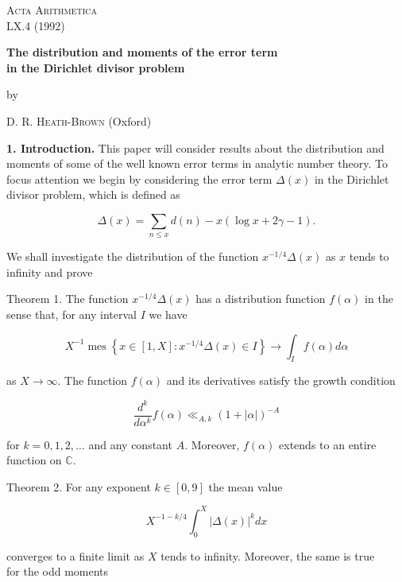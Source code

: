 \documentclass[10pt]{article}
\newcommand{\articleSection}[2]{%
  \par\medskip\noindent\textbf{#1. #2.}\enspace
}
\begin{document}
\vspace*{-2em}
\begin{flushleft}
\textsc{Acta Arithmetica}\\
LX.4 (1992)
\end{flushleft}

\vspace{4em}
\begin{center}
{\LARGE\bfseries The distribution and moments of the error term\\
in the Dirichlet divisor problem\par}
\vspace{1.5em}
{\normalsize by\par}
\vspace{0.8em}
{\large\textsc{D. R. Heath-Brown} (Oxford)\par}
\end{center}
\vspace{2.5em}

\articleSection{1}{Introduction}This paper will consider results about the distribution and moments of some of the well known error terms in analytic number theory. To focus attention we begin by considering the error term $\Delta(x)$ in the Dirichlet divisor problem, which is defined as

$$
\Delta(x)=\sum_{n \leq x} d(n)-x(\log x+2 \gamma-1) .
$$

We shall investigate the distribution of the function $x^{-1 / 4} \Delta(x)$ as $x$ tends to infinity and prove

Theorem 1. The function $x^{-1 / 4} \Delta(x)$ has a distribution function $f(\alpha)$ in the sense that, for any interval $I$ we have

$$
X^{-1} \operatorname{mes}\left\{x \in[1, X]: x^{-1 / 4} \Delta(x) \in I\right\} \rightarrow \int_{I} f(\alpha) d \alpha
$$

as $X \rightarrow \infty$. The function $f(\alpha)$ and its derivatives satisfy the growth condition

$$
\frac{d^{k}}{d \alpha^{k}} f(\alpha) \ll_{A, k}(1+|\alpha|)^{-A}
$$

for $k=0,1,2, \ldots$ and any constant $A$. Moreover, $f(\alpha)$ extends to an entire function on $\mathbb{C}$.

Theorem 2. For any exponent $k \in[0,9]$ the mean value

$$
X^{-1-k / 4} \int_{0}^{X}|\Delta(x)|^{k} d x
$$

converges to a finite limit as $X$ tends to infinity. Moreover, the same is true\\
for the odd moments
\end{document}
